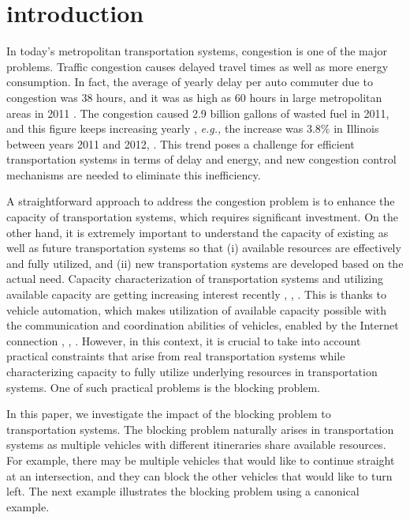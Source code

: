 \documentclass[conference]{IEEEtran}
\newcommand{\eg}{{\em e.g., }}
\begin{document}
\section{\label{sec:intro} introduction}
In today's metropolitan transportation systems, congestion is one of the major problems. Traffic congestion causes delayed travel times as well as more energy consumption. In fact, the average of yearly delay per auto commuter due to congestion was 38 hours, and it was as high as 60 hours in large metropolitan areas in 2011 \cite{urban_mobility_report}. The congestion caused 2.9 billion gallons of wasted fuel in 2011, and this figure keeps increasing yearly \cite{urban_mobility_report}, \eg the increase was 3.8\% in Illinois between years 2011 and 2012, \cite{illinois_mobility}. This trend poses a challenge for efficient transportation systems in terms of delay and energy, and new congestion control mechanisms are needed to eliminate this inefficiency.

A straightforward approach to address the congestion problem is to enhance the capacity of transportation systems, which requires significant investment. On the other hand, it is extremely important to understand the capacity of existing as well as future transportation systems so that (i) available resources are effectively and fully utilized, and (ii) new transportation systems are developed based on the actual need. Capacity characterization of transportation systems and utilizing available capacity are getting increasing interest recently \cite{dresner}, \cite{papageorgiou}, \cite{gregoire}. This is thanks to vehicle automation, which makes utilization of available capacity possible with the communication and coordination abilities of vehicles, enabled by the Internet connection \cite{dresner}, \cite{papageorgiou}, \cite{gregoire}. However, in this context, it is crucial to take into account practical constraints that arise from real transportation systems while characterizing capacity to fully utilize underlying resources in transportation systems. One of such practical problems is the blocking problem.

In this paper, we investigate the impact of the blocking problem to transportation systems. The blocking problem naturally arises in transportation systems as multiple vehicles with different itineraries share available resources. For example, there may be multiple vehicles that would like to continue straight at an intersection, and they can block the other vehicles that would like to turn left. The next example illustrates the blocking problem using a canonical example.
\end{document}
